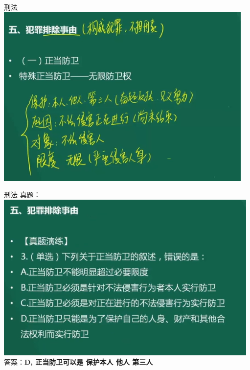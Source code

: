 \documentclass[aspectratio=169]{beamer}
\begin{document}
\begin{frame}[t]{刑法}
    \includegraphics[scale=0.6]{self-defince}\\ 
\end{frame}

\begin{frame}[t]{刑法}
    真题：\\
    \includegraphics[scale=0.6]{self-defince-question}\\ 
    答案：\textbf{D, 正当防卫可以是 保护本人 他人 第三人}\\
\end{frame}
\end{document}
